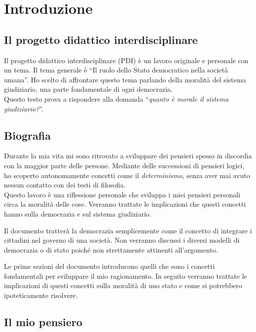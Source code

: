 \documentclass[a4paper, 12pt]{article}
\newcommand{\quotes}[1]{``#1''}
\begin{document}
\pagebreak

\tableofcontents
\pagebreak

\section{Introduzione}

\subsection{Il progetto didattico interdisciplinare}

Il progetto didattico interdisciplinare (PDI) è un lavoro originale e personale
con un tema. Il tema generale è \quotes{Il ruolo dello Stato democratico nella società umana}.
Ho scelto di affrontare questo tema parlando della moralità del sistema giudiziario,
una parte fondamentale di ogni democrazia. \\
Questo testo prova a rispondere alla domanda \quotes{\textit{quanto è morale il sistema giudiziario?}}.

\subsection{Biografia}

Durante la mia vita mi sono ritrovato a sviluppare dei pensieri
spesso in discordia con la maggior parte delle persone.
Mediante delle successioni di pensieri logici, ho scoperto autonomamente concetti
come il \textit{determinismo}, senza aver mai avuto nessun contatto con dei testi di filosofia.
\\
Questo lavoro è una riflessione personale che sviluppa i miei pensieri
personali circa la moralità delle cose. Verranno trattate le implicazioni
che questi concetti hanno sulla democrazia e sul sistema giudiziario.

Il documento tratterà la democrazia semplicemente come il concetto di integrare i cittadini
nel governo di una società. Non verranno discussi i diversi modelli di democrazia o di stato
poiché non strettamente attinenti all'argomento.

Le prime sezioni del documento introducono quelli che sono i concetti fondamentali per
sviluppare il mio ragionamento. In seguito verranno trattate
le implicazioni di questi concetti sulla moralità di uno stato e come si potrebbero
ipoteticamente risolvere.

\subsection{Il mio pensiero}
\end{document}
